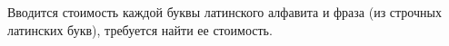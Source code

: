 Вводится стоимость каждой буквы латинского алфавита и фраза (из строчных латинских букв), требуется найти ее стоимость.
